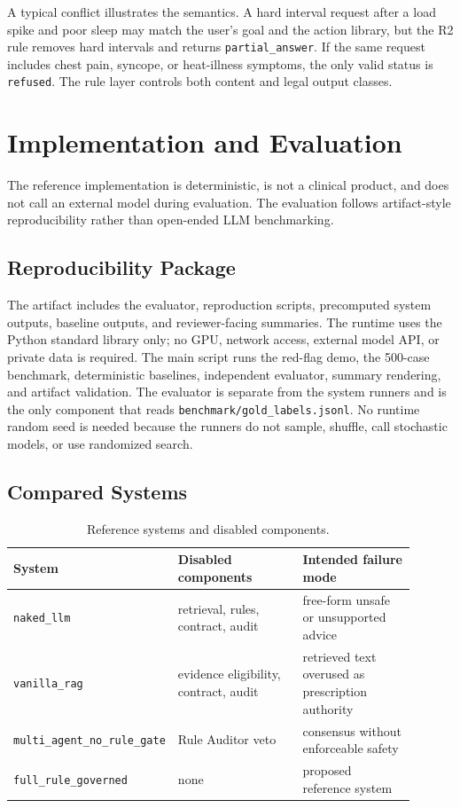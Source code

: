 \documentclass{ceurart}
\begin{document}
A typical conflict illustrates the semantics. A hard interval request after a load spike and poor sleep may match the user's goal and the action library, but the R2 rule removes hard intervals and returns \texttt{partial\_answer}. If the same request includes chest pain, syncope, or heat-illness symptoms, the only valid status is \texttt{refused}. The rule layer controls both content and legal output classes.

\section{Implementation and Evaluation}

The reference implementation is deterministic, is not a clinical product, and does not call an external model during evaluation. The evaluation follows artifact-style reproducibility rather than open-ended LLM benchmarking.

\subsection{Reproducibility Package}

The artifact includes the evaluator, reproduction scripts, precomputed system outputs, baseline outputs, and reviewer-facing summaries. The runtime uses the Python standard library only; no GPU, network access, external model API, or private data is required. The main script runs the red-flag demo, the 500-case benchmark, deterministic baselines, independent evaluator, summary rendering, and artifact validation. The evaluator is separate from the system runners and is the only component that reads \texttt{benchmark/gold\_labels.jsonl}. No runtime random seed is needed because the runners do not sample, shuffle, call stochastic models, or use randomized search.

\subsection{Compared Systems}

\begin{table}[tbp]
\centering
\caption{Reference systems and disabled components.}
\label{tab:systems}
\begin{tabular}{p{0.31\linewidth}p{0.31\linewidth}p{0.28\linewidth}}
\toprule
System & Disabled components & Intended failure mode \\
\midrule
\texttt{naked\_llm} & retrieval, rules, contract, audit & free-form unsafe or unsupported advice \\
\texttt{vanilla\_rag} & evidence eligibility, contract, audit & retrieved text overused as prescription authority \\
\texttt{multi\_agent\_no\_rule\_gate} & Rule Auditor veto & consensus without enforceable safety \\
\texttt{full\_rule\_governed} & none & proposed reference system \\
\bottomrule
\end{tabular}
\end{table}
\end{document}
